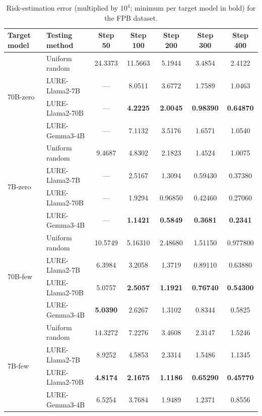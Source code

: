 \begin{table}[h]
    \centering
    \small
    \begin{tabular}{l l c c c c c}
        \toprule
        Target model & Testing method & Step 50 & Step 100 & Step 200 & Step 300 & Step 400 \\
        \midrule
        \multirow{4}{*}{70B-zero} & Uniform random & 24.3373 & 11.5663 & 5.1944 & 3.4854 &2.4122\\
        &LURE-Llama2-7B & --- & 8.0511 & 3.6772  & 1.7589  & 1.0463 \\
        &LURE-Llama2-70B & --- & \textbf{4.2225} & \textbf{2.0045}  & \textbf{0.98390}  & \textbf{0.64870} \\
        &LURE-Gemma3-4B & --- & 7.1132 & 3.5176 & 1.6571 & 1.0540 \\
        \hline
        \multirow{4}{*}{7B-zero}& Uniform random & 9.4687   & 4.8302 &  2.1823 &  1.4524 &  1.0075\\
        & LURE-Llama2-7B & --- & 2.5167  &  1.3094  &  0.59430 &  0.37380 \\
        & LURE-Llama2-70B & --- & 1.9294  &  0.96850 & 0.42460 & 0.27060 \\
        &LURE-Gemma3-4B & --- & \textbf{1.1421} &\textbf{0.5849}& \textbf{0.3681}&
        \textbf{0.2341}\\
        \hline
        \multirow{4}{*}{70B-few}&  Uniform random & 10.5749 &  5.16310  &  2.48680  & 1.51150  &  0.977800 \\
        &LURE-Llama2-7B & 6.3984  &  3.2058  &  1.3719  &  0.89110 &  0.63880 \\
        & LURE-Llama2-70B & 5.0757 &  \textbf{2.5057}   & \textbf{1.1921}   & \textbf{0.76740}  & \textbf{0.54300} \\
        &LURE-Gemma3-4B & \textbf{5.0390} &  2.6267& 1.3102& 0.8344&
        0.5825\\
        \hline
        \multirow{4}{*}{7B-few} & Uniform random &14.3272 &  7.2276& 3.4608 &  2.3147 & 1.5246 \\
        & LURE-Llama2-7B & 8.9252 &  4.5853 &  2.3314 &  1.5486 &  1.1345 \\
        & LURE-Llama2-70B & \textbf{4.8174 } &  \textbf{2.1675}  &  \textbf{1.1186 } &  \textbf{0.65290}  & \textbf{ 0.45770} \\
        &LURE-Gemma3-4B & 6.5254 & 3.7684 &1.9489& 1.2371& 0.8556 \\
        \bottomrule
    \end{tabular}
    \vspace{1em}
    \caption{
        Risk-estimation error (multiplied by $10^4$; minimum per target model in bold) for the FPB dataset.
    }
    \label{tab:1}
\end{table}


